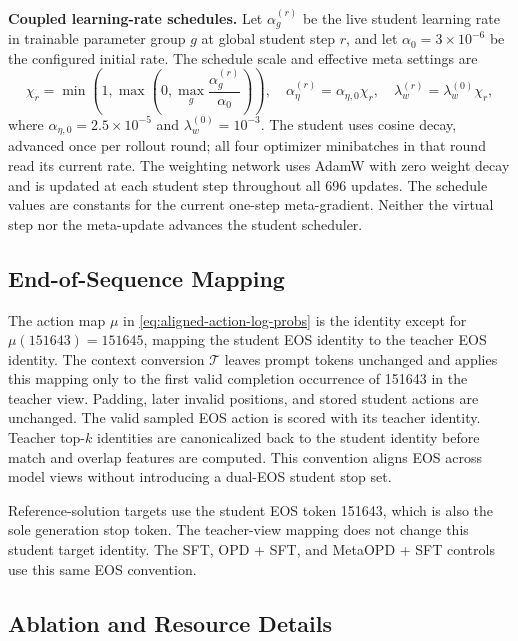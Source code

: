 \documentclass{article}
\theoremstyle{plain}
\theoremstyle{definition}
\theoremstyle{remark}
\begin{document}
\textbf{Coupled learning-rate schedules.}
\label{app:meta-schedule}
Let \(\alpha_g^{(r)}\) be the live student learning rate in trainable parameter group \(g\)
at global student step \(r\), and let \(\alpha_0=3\times10^{-6}\) be the configured initial rate.
The schedule scale and effective meta settings are
\begin{equation}
    \chi_r=\min\!\left(1,\max\!\left(0,\max_g\frac{\alpha_g^{(r)}}{\alpha_0}\right)\right),
    \quad \alpha_\eta^{(r)}=\alpha_{\eta,0}\chi_r,
    \quad \lambda_w^{(r)}=\lambda_w^{(0)}\chi_r,
 \label{eq:meta-schedule}
\end{equation}
where \(\alpha_{\eta,0}=2.5\times10^{-5}\) and \(\lambda_w^{(0)}=10^{-3}\).
The student uses cosine decay, advanced once per rollout round; all four optimizer minibatches
in that round read its current rate. The weighting network uses AdamW with zero weight decay and is
updated at each student step throughout all 696 updates. The schedule values are constants
for the current one-step meta-gradient. Neither the virtual step nor the meta-update advances
the student scheduler.

\subsection{End-of-Sequence Mapping}
\label{app:eos-mapping}

The action map \(\mu\) in \cref{eq:aligned-action-log-probs} is the identity except for
\(\mu(151643)=151645\), mapping the student EOS identity to the teacher EOS identity.
The context conversion \(\mathcal T\) leaves prompt tokens unchanged and applies this mapping
only to the first valid completion occurrence of 151643 in the teacher view. Padding, later
invalid positions, and stored student actions are unchanged. The valid sampled EOS action is
scored with its teacher identity. Teacher top-\(k\) identities are canonicalized back to the
student identity before match and overlap features are computed. This convention aligns EOS
across model views without introducing a dual-EOS student stop set.

Reference-solution targets use the student EOS token 151643, which is also the sole generation stop token. The teacher-view mapping does not change this student target identity. The SFT, OPD + SFT, and MetaOPD + SFT controls use this same EOS convention.

\subsection{Ablation and Resource Details}
\label{app:ablation-resources}
\end{document}
